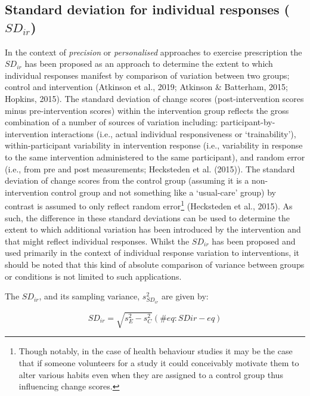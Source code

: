 \documentclass[
]{article}
\begin{document}
\hypertarget{standard-deviation-for-individual-responses-sd_ir}{%
\subsection{\texorpdfstring{Standard deviation for individual responses (\(SD_{ir}\))}{Standard deviation for individual responses (SD\_\{ir\})}}\label{standard-deviation-for-individual-responses-sd_ir}}

In the context of \emph{precision} or \emph{personalised} approaches to exercise prescription the \(SD_{ir}\) has been proposed as an approach to determine the extent to which individual responses manifest by comparison of variation between two groups; control and intervention (Atkinson et al., 2019; Atkinson \& Batterham, 2015; Hopkins, 2015). The standard deviation of change scores (post-intervention scores minus pre-intervention scores) within the intervention group reflects the gross combination of a number of sources of variation including: participant-by-intervention interactions (i.e., actual individual responsiveness or `trainability'), within-participant variability in intervention response (i.e., variability in response to the same intervention administered to the same participant), and random error (i.e., from pre and post measurements; Hecksteden et al. (2015)). The standard deviation of change scores from the control group (assuming it is a non-intervention control group and not something like a `usual-care' group) by contrast is assumed to only reflect random error\footnote{Though notably, in the case of health behaviour studies it may be the case that if someone volunteers for a study it could conceivably motivate them to alter various habits even when they are assigned to a control group thus influencing change scores.} (Hecksteden et al., 2015). As such, the difference in these standard deviations can be used to determine the extent to which additional variation has been introduced by the intervention and that might reflect individual responses. Whilst the \(SD_{ir}\) has been proposed and used primarily in the context of individual response variation to interventions, it should be noted that this kind of absolute comparison of variance between groups or conditions is not limited to such applications.

The \(SD_{ir}\), and its sampling variance, \(s^2_{SD_{ir}}\) are given by:

\begin{equation}
SD_{ir}=\sqrt{s^2_{E} - s^2_{C}}
(\#eq:SDir-eq)
\end{equation}
\end{document}

